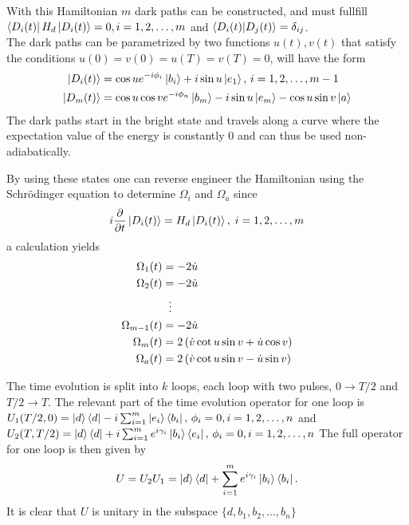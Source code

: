 With this Hamiltonian $m$ dark paths can be constructed, and must fullfill $\bra{D_i(t)}H_d\ket{D_i(t)} = 0, i = 1,2,\dots,m$ and $\bra{D_i(t)}\ket{D_j(t)} = \delta_{ij}$.\\
The dark paths can be parametrized by two functions $u(t),v(t)$ that satisfy the conditions $u(0) = v(0) = u(T) = v(T) = 0$,  will have the form
\begin{equation}
\begin{aligned}
\ket{D_i(t)} &= \cos u e^{-i\phi_i}\ket{b_i} + i\sin u \ket{e_1},\, i = 1,2,\dots,m-1
\\
\ket{D_m(t)} &= \cos u \cos v e^{-i\phi_n}\ket{b_m} - i\sin u \ket{e_m} - \cos u \sin v \ket{a}
\end{aligned}
\end{equation}
The dark paths start in the bright state and travels along a curve where the expectation value of the energy is constantly $0$ and can thus be used non-adiabatically.

By using these states one can reverse engineer the Hamiltonian using the Schrödinger equation to determine $\Omega_i$ and $\Omega_a$ since 
\begin{equation}
i\pdv{}{t}\ket{D_i(t)} = H_d\ket{D_i(t)},\; i = 1,2,\dots,m
\end{equation}
a calculation  yields
\begin{equation}
\begin{aligned}
\Omega_1(t) &= -2\dot{u}
\\ 
\Omega_2(t) &= -2\dot{u}
\\
&\hspace{2mm}\vdots
\\
\Omega_{m-1}(t) &= -2\dot{u}
\\
\Omega_m(t) &= 2\left(\dot{v}\cot u\sin v + \dot{u}\cos v \right)
\\
\Omega_a(t) &= 2\left(\dot{v}\cot u\sin v - \dot{u}\sin v \right)
\end{aligned}
\end{equation}

The time evolution is split into $k$ loops, each loop with two pulses, $0 \longrightarrow T/2$ and $T/2 \longrightarrow T$. The relevant part of the time evolution operator for one loop is  
$U_1(T/2,0) = \ket{d}\bra{d} -i\sum_{i = 1}^m \ket{e_i}\bra{b_i},\, \phi_i = 0, i = 1,2,\dots,n$ and $U_2(T,T/2) = \ket{d}\bra{d} + i\sum_{i = 1}^m e^{i\gamma_i}\ket{b_i}\bra{e_i},\, \phi_i = 0, i = 1,2,\dots,n $
The full operator for one loop is then given by 
\begin{equation}
U = U_2U_1 = \ket{d}\bra{d} + \sum_{i = 1}^{m}e^{i\gamma_i}\ket{b_i}\bra{b_i}.
\end{equation}
It is clear that $U$ is unitary in the subspace $\{d,b_1,b_2,\dots,b_n\}$

